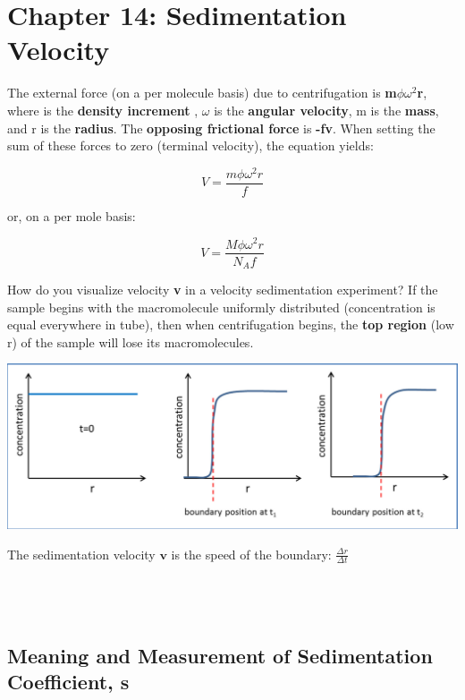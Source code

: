\documentclass[12pt, letterpaper]{article}
\begin{document}
    \section*{Chapter 14: Sedimentation Velocity}
    The external force (on a per molecule basis) due to centrifugation is 
    \textbf{m$\phi\omega^2$r}, where \boldmath{$\phi$} is the \textbf{density increment}
    , \textbf{$\omega$} is the \textbf{angular velocity}, m is the 
    \textbf{mass}, and r is the \textbf{radius}. The \textbf{opposing frictional force} is 
    \textbf{-fv}. When setting the sum of these forces to zero (terminal velocity), 
    the equation yields: 

    \begin{equation}
        V = \frac{m\phi\omega^2 r}{f}
    \end{equation}

        or, on a per mole basis: 

    \begin{equation}
        V = \frac{M\phi\omega^2 r}{N_Af}
    \end{equation}

    How do you visualize velocity \textbf{v} in a velocity sedimentation experiment? If the
    sample begins with the macromolecule uniformly distributed (concentration is equal everywhere
    in tube), then when centrifugation begins, the \textbf{top region} (low r) of the sample will lose its 
    macromolecules.  

        
 
   \includegraphics[scale = 0.70]{Sedimentaton Velocity with Radius.png}

    The sedimentation velocity $\textbf{v}$ is the speed of the boundary: \(\frac{\Delta r}{\Delta t} \) %
    \\
    \\
    \\
    \\

    \subsection*{Meaning and Measurement of Sedimentation Coefficient, s}
\end{document}
